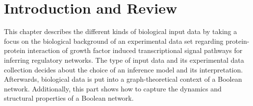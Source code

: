 \chapter{Introduction and Review}

This chapter describes the different kinds of biological input data by taking a focus on the biological background of an experimental data set regarding protein-protein interaction of growth factor induced transcriptional signal pathways for inferring regulatory networks. The type of input data and its experimental data collection decides about the choice of an inference model and its interpretation.\\

Afterwards, biological data is put into a graph-theoretical context of a Boolean network. Additionally, this part shows how to capture the dynamics and structural properties of a Boolean network.

